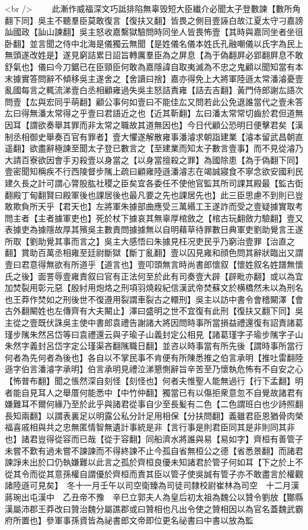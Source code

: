 <br />
　　此漸作威福深文巧詆排陷無辜毁短大臣纎介必聞太子登數諫【數所角翻下同】吳主不聽羣臣莫敢復言【復扶又翻】皆畏之側目壹誣白故江夏太守刁嘉謗訕國政【訕山諫翻】吳主怒收嘉繫獄驗問時同坐人皆畏怖壹【其時與嘉同坐者坐徂卧翻】並言聞之侍中北海是儀獨云無聞【是姓儀名儀本姓氏孔融嘲儀以氏字為民上無頭遂改姓是】遂見窮詰累日詔旨轉厲羣臣為之屏息【為于偽翻屛必郢翻屛息不敢舒氣也】儀曰今刀鋸已在臣頸臣何敢為嘉隱諱自取夷滅為不忠之鬼顧以聞知當有本末據實答問辭不傾移吳主遂舍之【舍讀曰捨】嘉亦得免上大將軍陸遜太常潘濬憂壹亂國每言之輒流涕壹白丞相顧雍過失吳主怒詰責雍【詰去吉翻】黃門侍郎謝厷語次問壹【厷與宏同乎萌翻】顧公事何如壹曰不能佳厷又問若此公免退誰當代之壹未答厷曰得無潘太常得之乎壹曰君語近之也【近其靳翻】厷曰潘太常常切齒於君但道無因耳【謂欲奏舉其罪而非太常之職故其道無因也】今日代顧公恐明日便擊君矣【漢制丞相御史舉奏百官有罪者】壹大懼遂解散雍事潘濬求朝詣建業【濬本留武昌朝直遥翻】欲盡辭極諫至聞太子登已數言之【至建業而知太子數言壹事】而不見從濬乃大請百寮欲因會手刃殺壹以身當之【以身當擅殺之罪】為國除患【為于偽翻下同】壹密聞知稱疾不行西陵督步隲上疏曰顧雍陸遜潘濬志在竭誠寢食不寧念欲安國利民建久長之計可謂心膂股肱社稷之臣矣宜各委任不使他官監其所司課其殿最【監古衘翻殿丁甸翻賢曰殿軍後也課居後也最凡要之先也課居先也】此三臣思慮不到則已豈敢欺負所天乎【君天也】左將軍朱據部曲應受三萬緡工王遂詐而受之壹疑據實取考問主者【主者據軍吏也】死於杖下據哀其無辜厚棺斂之【棺古玩翻斂力驗翻】壹又表據吏為據隱故厚其殯吳主數責問據據無以自明藉草待罪數日典軍吏劉助覺言王遂所取【劉助覺其事而言之】吳主大感悟曰朱據見枉况吏民乎乃窮治壹罪【治直之翻】賞助百萬丞相雍至廷尉斷獄【斷丁亂翻】壹以囚見雍和顔色問其辭狀臨出又謂壹曰君意得無欲有所道乎【道言也】壹叩頭無言時尚書郎懷叙【懷姓叙名姓譜無懷氏之後】面詈辱壹雍責叙曰官有正法何至於此有司奏壹大辟【辟毗亦翻】或以為宜加焚裂用彰元惡【殷紂用炮烙之刑項羽燒殺紀信漢武帝焚蘇文於横橋然未以為刑名也王莽作焚如之刑後世不復遵用裂謂車裂古之轘刑】吳主以訪中書令會稽闞澤【會古外翻闞姓也左傳齊有大夫闞止】澤曰盛明之世不宜復有此刑【復扶又翻下同】吳主從之壹既伏誅吳主使中書郎袁禮告謝諸大將因問時事所當損益禮還復有詔責諸葛瑾步隲朱然呂岱等曰袁禮還云與子瑜子山義封定公相見【諸葛瑾字子瑜步隲字子山朱然字義封呂岱字定公瑾渠吝翻隲職日翻】並咨以時事當有所先後【謂時事所當行何者為先何者為後也】各自以不掌民事不肯便有所陳悉推之伯言承明【推吐雷翻陸遜字伯言潘濬字承明】伯言承明見禮泣涕懇惻辭旨辛苦至乃懷執危怖有不自安之心【怖普布翻】聞之悵然深自刻怪【刻怪也】何者夫惟聖人能無過行【行下孟翻】明者能自見耳人之舉厝何能悉中【中竹仲翻】獨當已有以傷拒衆意忽不自覺故諸君有嫌難耳不爾何緣乃至於此乎與諸君從事自少至長髪有二色【二色謂班白也少詩照翻長知兩翻】以謂表裏足以明露公私分計足用相保【分扶問翻】義雖君臣恩猶骨肉榮福喜戚相與共之忠無匿情智無遺計事統是非【言行事是則君臣同其是非則同其非也】諸君豈得從容而已哉【從于容翻】同船濟水將誰與易【易如字】齊桓有善管子未嘗不歎有過未嘗不諫諫而不得終諫不止今孤自省無桓公之德【省悉景翻】而諸君諫諍未出於口仍執嫌難以此言之孤於齊桓良優未知諸君於管子何如耳【下之於上不從其令而從其意孫權自謂優於齊桓而責其臣以管子使吳誠有管子亦不敢盡言於權觀諸陸遜可見矣】　冬十一月壬午以司空衛臻為司徒司隸校尉崔林為司空　十二月漢蔣琬出屯漢中　乙丑帝不豫　辛巳立郭夫人為皇后初太祖為魏公以贊令劉放【酇縣漢屬沛郡王莽改曰贊治魏分屬譙郡或曰贊相也凡出令使之贊相因以為官名蓋魏武霸府所置也】參軍事孫資皆為祕書郎文帝即位更名祕書曰中書以放為監